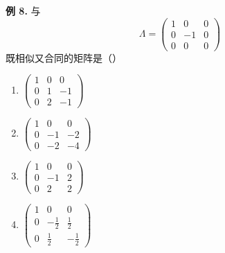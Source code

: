 \begin{problemblock}
\textbf{例 8.} 与
\[
\Lambda=\begin{pmatrix}1&0&0\\0&-1&0\\0&0&0\end{pmatrix}
\]
既相似又合同的矩阵是（\quad）
\begin{enumerate}[label=\Alph*.]
\item \(\begin{pmatrix}1&0&0\\0&1&-1\\0&2&-1\end{pmatrix}\)
\item \(\begin{pmatrix}1&0&0\\0&-1&-2\\0&-2&-4\end{pmatrix}\)
\item \(\begin{pmatrix}1&0&0\\0&-1&2\\0&2&2\end{pmatrix}\)
\item \(\begin{pmatrix}1&0&0\\0&-\frac12&\frac12\\0&\frac12&-\frac12\end{pmatrix}\)
\end{enumerate}
\end{problemblock}
\begin{solutionblock}
\end{solutionblock}


